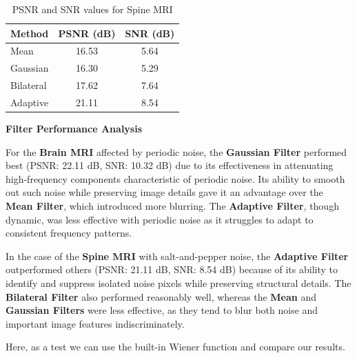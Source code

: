 \documentclass[hidelinks,12pt]{article}
\begin{document}
	\begin{table}[h!]
		\centering
		\begin{tabular}{lcc}
			\toprule
			Method        & PSNR (dB) & SNR (dB)  \\
			\midrule
			Mean          & 16.53      & 5.64      \\
			Gaussian      & 16.30      & 5.29      \\
			Bilateral     & 17.62      & 7.64      \\
			Adaptive      & 21.11      & 8.54      \\
			\bottomrule
		\end{tabular}
		\caption{PSNR and SNR values for Spine MRI}
	\end{table}
	
	\textbf{Filter Performance Analysis}

	
	For the \textbf{Brain MRI} affected by periodic noise, the \textbf{Gaussian Filter} performed best (PSNR: 22.11 dB, SNR: 10.32 dB) due to its effectiveness in attenuating high-frequency components characteristic of periodic noise. Its ability to smooth out such noise while preserving image details gave it an advantage over the \textbf{Mean Filter}, which introduced more blurring. The \textbf{Adaptive Filter}, though dynamic, was less effective with periodic noise as it struggles to adapt to consistent frequency patterns.
	
	In the case of the \textbf{Spine MRI} with salt-and-pepper noise, the \textbf{Adaptive Filter} outperformed others (PSNR: 21.11 dB, SNR: 8.54 dB) because of its ability to identify and suppress isolated noise pixels while preserving structural details. The \textbf{Bilateral Filter} also performed reasonably well, whereas the \textbf{Mean} and \textbf{Gaussian Filters} were less effective, as they tend to blur both noise and important image features indiscriminately.
	
	
	Here, as a test we can use the built-in Wiener function and compare our results.
	
\end{document}
